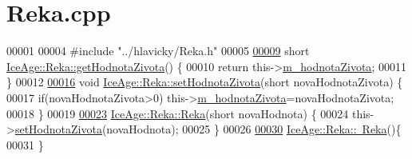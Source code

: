 \hypertarget{Reka_8cpp_source}{}\section{Reka.\+cpp}
\label{Reka_8cpp_source}

\begin{DoxyCode}
00001 
00004 \textcolor{preprocessor}{#include "../hlavicky/Reka.h"}
00005 
\hypertarget{Reka_8cpp_source.tex_l00009}{}\hyperlink{classIceAge_1_1Reka_acc4d9a4ef69da03eed8762e16a33b49f}{00009} \textcolor{keywordtype}{short} \hyperlink{classIceAge_1_1Reka_acc4d9a4ef69da03eed8762e16a33b49f}{IceAge::Reka::getHodnotaZivota}() \{
00010     \textcolor{keywordflow}{return} this->\hyperlink{classIceAge_1_1Reka_acc162b1ee9e0678f92750a7e972460fa}{m\_hodnotaZivota};
00011 \}
00012 
\hypertarget{Reka_8cpp_source.tex_l00016}{}\hyperlink{classIceAge_1_1Reka_a42bce1e2ee5f7249ee9800ca6058aab6}{00016} \textcolor{keywordtype}{void} \hyperlink{classIceAge_1_1Reka_a42bce1e2ee5f7249ee9800ca6058aab6}{IceAge::Reka::setHodnotaZivota}(\textcolor{keywordtype}{short} novaHodnotaZivota) \{
00017     \textcolor{keywordflow}{if}(novaHodnotaZivota>0) this->\hyperlink{classIceAge_1_1Reka_acc162b1ee9e0678f92750a7e972460fa}{m\_hodnotaZivota}=novaHodnotaZivota;
00018 \}
00019 
\hypertarget{Reka_8cpp_source.tex_l00023}{}\hyperlink{classIceAge_1_1Reka_ac851511c842c8d8aa746be21562fd9c4}{00023} \hyperlink{classIceAge_1_1Reka_ac851511c842c8d8aa746be21562fd9c4}{IceAge::Reka::Reka}(\textcolor{keywordtype}{short} novaHodnota) \{
00024     this->\hyperlink{classIceAge_1_1Reka_a42bce1e2ee5f7249ee9800ca6058aab6}{setHodnotaZivota}(novaHodnota);
00025 \}
00026 
\hypertarget{Reka_8cpp_source.tex_l00030}{}\hyperlink{classIceAge_1_1Reka_a7d29458f88fcd62378c9178b81ec2c51}{00030} \hyperlink{classIceAge_1_1Reka_a7d29458f88fcd62378c9178b81ec2c51}{IceAge::Reka::~Reka}()\{
00031 \}
\end{DoxyCode}
